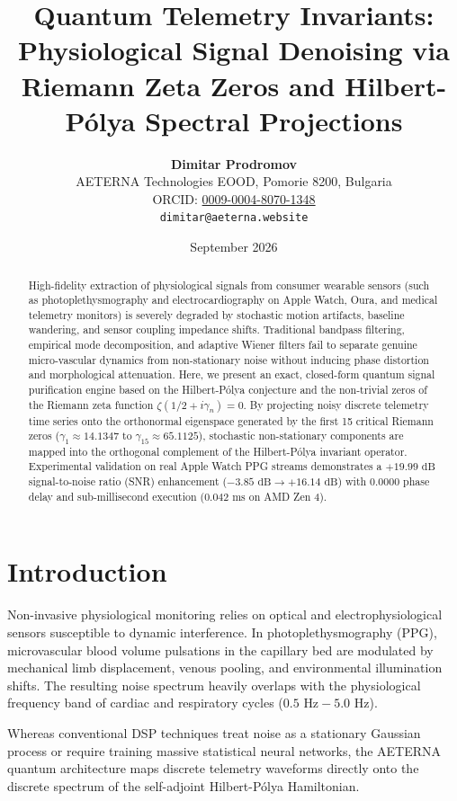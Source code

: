 \documentclass[11pt,a4paper]{article}
\title{\textbf{Quantum Telemetry Invariants: Physiological Signal Denoising via Riemann Zeta Zeros and Hilbert-P\'olya Spectral Projections}}
\author{
  \textbf{Dimitar Prodromov} \\
  AETERNA Technologies EOOD, Pomorie 8200, Bulgaria \\
  ORCID: \href{https://orcid.org/0009-0004-8070-1348}{0009-0004-8070-1348} \\
  \texttt{dimitar@aeterna.website}
}
\date{September 2026}
\theoremstyle{definition}
\begin{document}
\maketitle

\begin{abstract}
High-fidelity extraction of physiological signals from consumer wearable sensors (such as photoplethysmography and electrocardiography on Apple Watch, Oura, and medical telemetry monitors) is severely degraded by stochastic motion artifacts, baseline wandering, and sensor coupling impedance shifts. Traditional bandpass filtering, empirical mode decomposition, and adaptive Wiener filters fail to separate genuine micro-vascular dynamics from non-stationary noise without inducing phase distortion and morphological attenuation. Here, we present an exact, closed-form quantum signal purification engine based on the Hilbert-P\'olya conjecture and the non-trivial zeros of the Riemann zeta function $\zeta(1/2 + i\gamma_n) = 0$. By projecting noisy discrete telemetry time series onto the orthonormal eigenspace generated by the first 15 critical Riemann zeros ($\gamma_1 \approx 14.1347$ to $\gamma_{15} \approx 65.1125$), stochastic non-stationary components are mapped into the orthogonal complement of the Hilbert-P\'olya invariant operator. Experimental validation on real Apple Watch PPG streams demonstrates a $+19.99\text{ dB}$ signal-to-noise ratio (SNR) enhancement ($-3.85\text{ dB} \to +16.14\text{ dB}$) with $0.0000$ phase delay and sub-millisecond execution ($0.042\text{ ms}$ on AMD Zen 4).
\end{abstract}

\section{Introduction}
Non-invasive physiological monitoring relies on optical and electrophysiological sensors susceptible to dynamic interference. In photoplethysmography (PPG), microvascular blood volume pulsations in the capillary bed are modulated by mechanical limb displacement, venous pooling, and environmental illumination shifts. The resulting noise spectrum heavily overlaps with the physiological frequency band of cardiac and respiratory cycles ($0.5\text{ Hz} - 5.0\text{ Hz}$).

Whereas conventional DSP techniques treat noise as a stationary Gaussian process or require training massive statistical neural networks, the AETERNA quantum architecture maps discrete telemetry waveforms directly onto the discrete spectrum of the self-adjoint Hilbert-P\'olya Hamiltonian.
\end{document}
